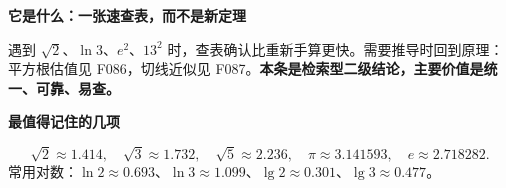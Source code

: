 \clearpage
\begin{statementbox}
\textbf{\textcolor{CStatement}{它是什么：一张速查表，而不是新定理}}
\par\medskip
\begin{center}

\end{center}
\medskip
遇到 $\sqrt2$、$\ln3$、$e^2$、$13^2$ 时，查表确认比重新手算更快。需要推导时回到原理：平方根估值见 F086，切线近似见 F087。\textbf{本条是检索型二级结论，主要价值是统一、可靠、易查。}
\end{statementbox}
\clearpage
\begin{statementbox}
\textbf{\textcolor{CStatement}{最值得记住的几项}}
\par\medskip
\begin{center}

\end{center}
\medskip
\[\sqrt2\approx1.414,\quad\sqrt3\approx1.732,\quad\sqrt5\approx2.236,\quad\pi\approx3.141593,\quad e\approx2.718282.\]常用对数：$\ln2\approx0.693$、$\ln3\approx1.099$、$\lg2\approx0.301$、$\lg3\approx0.477$。
\end{statementbox}
